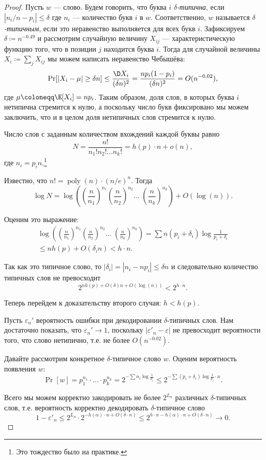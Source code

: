 \begin{proof}
    Пусть $ w $ --- слово. Будем говорить, что буква $ i $ \textit{$\delta$-типична}, если $
    |n_i / n - p_i| \le \delta$ где $ n_i $ --- количество букв $ i $ в $ w $. Соответственно, $ w $ называется \textit{$\delta$-типичным}, если это неравенство выполняется для всех букв $ i $. Зафиксируем $\delta \coloneqq n^{-0.49}$ и рассмотрим случайную величину $X_{ij}$ --- характеристическую функцию того, что в позиции $j$ находится буква $i$. Тогда для случайной величины $X_i\coloneqq \sum_j X_{ij}$ мы
    можем написать неравенство Чебышёва:
    \[\Pr[|X_i-\mu|\ge \delta n]\le\frac{\D X_i}{(\delta n)^2}=\frac{np_i(1-p_i)}{(\delta n)^2}=O(n^{-0.02}),\] где $\mu\coloneqq \E[X_i] = np_i$. Таким образом, доля слов, в которых буква $i$ нетипична стремится к нулю, а поскольку число букв фиксировано мы можем заключить, что и в целом доля нетипичных слов стремится к нулю. 
    
    Число слов с заданным количеством вхождений каждой буквы равно
    \[N = \frac{n!}{n_1!n_2!\dots n_k!}=h(p)\cdot n+o(n),\] где $n_i = p_in$.\footnote{Это тождество было на практике.}
    
    Известно, что $ n!=\operatorname{poly}(n)\cdot (n/e)^n $. Тогда
    \[ \log{N} =
        \log\left(\left(\frac{n}{n_1}\right)^{n_1}\left(\frac{n}{n_2}\right)^{n_2}\!\ldots\;\left(\frac{n}{n_k}\right)^{n_k}\right)
        + O(\log(n)). \]

    Оценим это выражение:
    \begin{multline*}
        \log\left(\left(\frac{n}{n_1}\right)^{n_1}\left(\frac{n}{n_2}\right)^{n_2}\!\ldots\;\left(\frac{n}{n_k}\right)^{n_k}\right)
        = \sum n(p_i+\delta_i)\log\frac{1}{p_i+\delta_i}\\
        \le n h(p)+O(\delta_in) < h\cdot n.
    \end{multline*}
    
    Так как это типичное слово, то $|\delta_i| = |n_i - np_i| \le \delta n$ и следовательно количество
    типичных слов не превосходит 
    $$ 2^{nh(p)+O(\delta) n + O(\log(n))} < 2^{h\cdot n}. $$

    Теперь перейдем к доказательству второго случая: $h < h(p)$.
    
    Пусть $\varepsilon_n'$ вероятность ошибки при декодировании $\delta$-типичных слов. Нам
    достаточно показать, что $\varepsilon_n' \to 1$, поскольку $|\varepsilon'_n - \varepsilon|$ не
    превосходит вероятности того, что слово нетипично, т.е. не более $O\left(n^{-0.02}\right)$.
    
    Давайте рассмотрим конкретное $\delta$-типичное слово $w$. Оценим вероятность появления $w$:
    $$ \Pr[w] = p_1^{n_1} \cdot \dots \cdot p_k^{n_k}
        = 2^{-\sum n_i \log\frac{1}{p_i}} \le 2^{-\sum (p_i + \delta_i) \log\frac{1}{p_i} \cdot n}.
    $$

    Всего мы можем корректно закодировать не более $2^{L_n}$ различных $\delta$-типичных слов,
    т.е. вероятность корректно декодировать $\delta$-типичное слово
    $$ 1 - \varepsilon'_n \le 2^{L_n} \cdot 2^{-h(\alpha)\cdot n + O(\delta\cdot n)} \le
            2^{h \cdot n - h(\alpha) \cdot n + O(\delta \cdot n)} 
            \to 0.
    $$
\end{proof}






